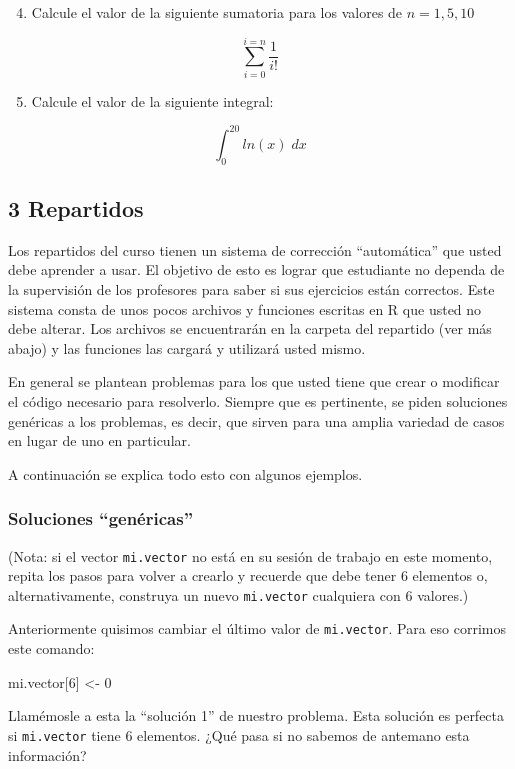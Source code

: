 \documentclass[]{article}
\newenvironment{Shaded}{}{}
\newcommand{\DecValTok}[1]{\textcolor[rgb]{0.25,0.63,0.44}{{#1}}}
\newcommand{\NormalTok}[1]{{#1}}
\begin{document}
\begin{enumerate}[1.]
\setcounter{enumi}{3}
\item
  Calcule el valor de la siguiente sumatoria para los valores de
  $n = 1, 5, 10$
\end{enumerate}
\[
  \sum_{i = 0} ^{i = n} \frac{1}{i!}
\]

\begin{enumerate}[1.]
\setcounter{enumi}{4}
\item
  Calcule el valor de la siguiente integral:
\end{enumerate}
\[
  \int_{0} ^{20} ln(x) \; dx
\]

\subsection{3 Repartidos}

Los repartidos del curso tienen un sistema de corrección ``automática''
que usted debe aprender a usar. El objetivo de esto es lograr que
estudiante no dependa de la supervisión de los profesores para saber si
sus ejercicios están correctos. Este sistema consta de unos pocos
archivos y funciones escritas en R que usted no debe alterar. Los
archivos se encuentrarán en la carpeta del repartido (ver más abajo) y
las funciones las cargará y utilizará usted mismo.

En general se plantean problemas para los que usted tiene que crear o
modificar el código necesario para resolverlo. Siempre que es
pertinente, se piden soluciones genéricas a los problemas, es decir, que
sirven para una amplia variedad de casos en lugar de uno en particular.

A continuación se explica todo esto con algunos ejemplos.

\subsubsection{Soluciones ``genéricas''}

(Nota: si el vector \texttt{mi.vector} no está en su sesión de trabajo
en este momento, repita los pasos para volver a crearlo y recuerde que
debe tener 6 elementos o, alternativamente, construya un nuevo
\texttt{mi.vector} cualquiera con 6 valores.)

Anteriormente quisimos cambiar el último valor de \texttt{mi.vector}.
Para eso corrimos este comando:

\begin{Shaded}
\begin{Highlighting}[]
\NormalTok{mi.vector[}\DecValTok{6}\NormalTok{] <- }\DecValTok{0}
\end{Highlighting}
\end{Shaded}
Llamémosle a esta la ``solución 1'' de nuestro problema. Esta solución
es perfecta si \texttt{mi.vector} tiene 6 elementos. ¿Qué pasa si no
sabemos de antemano esta información?
\end{document}
